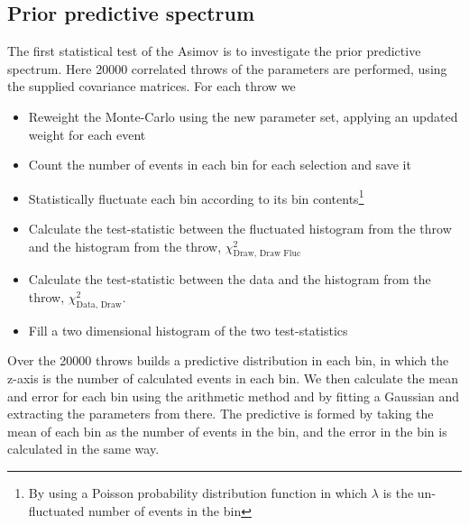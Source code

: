 
\subsection{Prior predictive spectrum}
The first statistical test of the Asimov is to investigate the prior predictive spectrum. Here 20000 correlated throws of the parameters are performed, using the supplied covariance matrices. For each throw we
\begin{itemize}
	\item Reweight the Monte-Carlo using the new parameter set, applying an updated weight for each event
	\item Count the number of events in each \pmu \cosmu bin for each selection and save it
	\item Statistically fluctuate each bin according to its bin contents\footnote{By using a Poisson probability distribution function in which $\lambda$ is the un-fluctuated number of events in the bin}
	\item Calculate the test-statistic between the fluctuated histogram from the throw and the histogram from the throw, $\chi^2_{\text{Draw, Draw Fluc}}$
	\item Calculate the test-statistic between the data and the histogram from the throw, $\chi^2_{\text{Data, Draw}}$.
	\item Fill a two dimensional histogram of the two test-statistics
\end{itemize}
Over the 20000 throws builds a predictive distribution in each \pmu \cosmu bin, in which the z-axis is the number of calculated events in each bin. We then calculate the mean and error for each bin using the arithmetic method and by fitting a Gaussian and extracting the parameters from there. The predictive is formed by taking the mean of each bin as the number of events in the bin, and the error in the bin is calculated in the same way.

